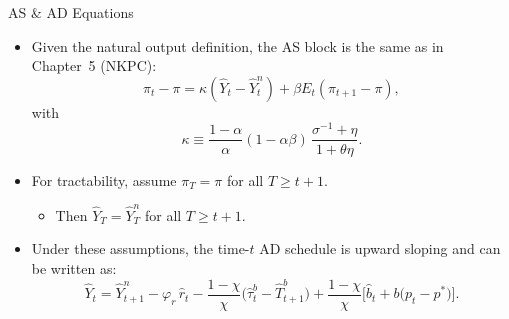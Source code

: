 \documentclass[11pt,aspectratio=169]{beamer}
\begin{document}
\begin{frame}{AS \& AD Equations}
\small
\begin{itemize}
  \item Given the natural output definition, the AS block is the same as in Chapter~5 (NKPC):
  \[
    \pi_t-\pi
    =\kappa(\hat Y_t-\hat Y_t^n)
    +\beta E_t(\pi_{t+1}-\pi),
  \]
  with
  \[
    \kappa \equiv \frac{1-\alpha}{\alpha}(1-\alpha\beta)\,
    \frac{\sigma^{-1}+\eta}{1+\theta\eta}.
  \]
  \vspace{0.35em}
  \item For tractability, assume $\pi_T=\pi$ for all $T\ge t+1$.
  \begin{itemize}
    \item Then $\hat Y_T=\hat Y_T^n$ for all $T\ge t+1$.
  \end{itemize}
  \vspace{0.35em}
  \item Under these assumptions, the time-$t$ AD schedule is upward sloping and can be written as:
  \[
    \hat{Y}_t
    = \hat{Y}_{t+1}^{n}
    - \varphi_r\,\hat{r}_t
    - \frac{1-\chi}{\chi}\big(\hat{\tau}_t^{b}-\hat{T}_{t+1}^{b}\big)
    + \frac{1-\chi}{\chi}\Big[\hat{b}_t + b\big(p_t-p^{*}\big)\Big].
  \]
\end{itemize}
\end{frame}

\end{document}
